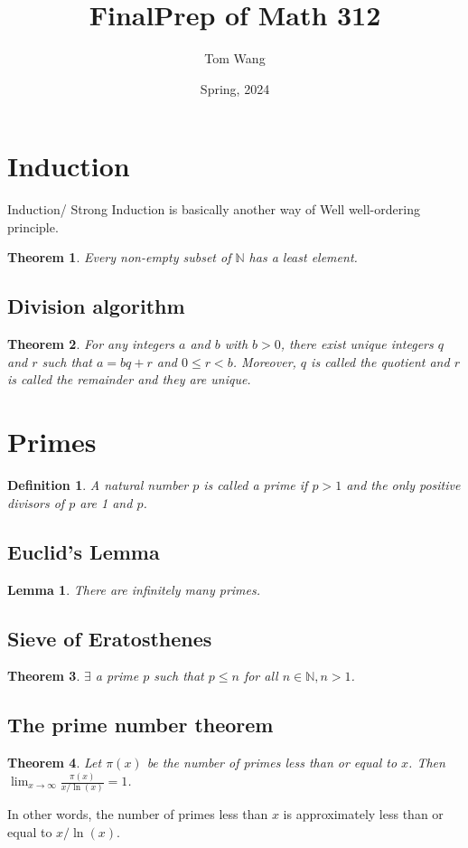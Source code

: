 \documentclass[letterpaper,12pt,oneside]{article}
\title{FinalPrep of Math 312}
\author{Tom Wang}
\date{Spring, 2024}
\newtheorem{theorem}{Theorem}
\newtheorem{definition}{Definition}
\newtheorem*{lemma}{Lemma}
\begin{document}
\maketitle
\thispagestyle{plain}
\section{Induction}
Induction/ Strong Induction is basically another way of Well well-ordering principle. \begin{theorem}
    Every non-empty subset of $\mathbb{N}$ has a least element.
\end{theorem}
\subsection{Division algorithm}
\begin{theorem}
    For any integers $a$ and $b$ with $b>0$, there exist unique integers $q$ and $r$ such that $a = bq + r$ and $0 \leq r < b$. Moreover, $q$ is called the quotient and $r$ is called the remainder and they are unique.
\end{theorem}
\section{Primes}
\begin{definition}
    A natural number $p$ is called a prime if $p > 1$ and the only positive divisors of $p$ are 1 and $p$.
\end{definition}
\subsection{Euclid's Lemma}
\begin{lemma}
    There are infinitely many primes.
\end{lemma}
\subsection{Sieve of Eratosthenes}
\begin{theorem}
    $\exists$ a prime $p$ such that $p\leq n$ for all $n\in \mathbb{N}, n>1$.
\end{theorem}
\subsection{The prime number theorem}
\begin{theorem}
    Let $\pi(x)$ be the number of primes less than or equal to $x$. Then $\lim_{x\to\infty} \frac{\pi(x)}{x/\ln(x)} = 1$.
\end{theorem}
In other words, the number of primes less than $x$ is approximately less than or equal to $x/\ln(x)$.
\end{document}
